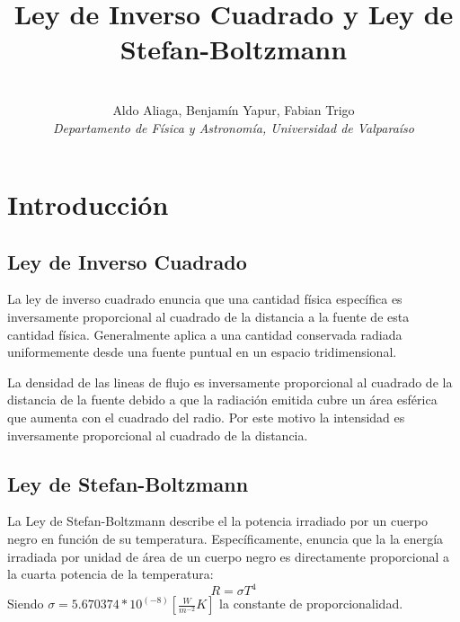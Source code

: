 \documentclass[a4paper,twocolumn,10pt]{article}
\begin{document}
\title{Ley de Inverso Cuadrado y Ley de Stefan-Boltzmann}
\author{ \\Aldo Aliaga, Benjamín Yapur, Fabian Trigo \\ \textit{Departamento de Física y Astronomía, Universidad de Valparaíso}}
\twocolumn[
  \begin{@twocolumnfalse}
    \maketitle
    \begin{abstract}
  
    \end{abstract}
  \end{@twocolumnfalse}\bigskip]

\vspace{2cm}

\section{Introducción}

\subsection{Ley de Inverso Cuadrado}
La ley de inverso cuadrado enuncia que una cantidad física específica es inversamente proporcional al cuadrado de la distancia a la fuente de esta cantidad física. Generalmente aplica a una cantidad conservada radiada uniformemente desde una fuente puntual en un espacio tridimensional. 

La densidad de las lineas de flujo es inversamente proporcional al cuadrado de la distancia de la fuente debido a que la radiación emitida cubre un área esférica que aumenta con el cuadrado del radio. Por este motivo la intensidad es inversamente proporcional al cuadrado de la distancia.

\subsection{Ley de Stefan-Boltzmann}
La Ley de Stefan-Boltzmann describe el la potencia irradiado por un cuerpo negro en función de su temperatura. Específicamente, enuncia que la la energía irradiada por unidad de área de un cuerpo negro es directamente proporcional a la cuarta potencia de la temperatura:
\begin{equation}
    R=\sigma T^4
\end{equation}
Siendo $\sigma= 5.670374*10^{(-8)} [\frac{W}{m^{-2}}K]$ la constante de proporcionalidad.
\end{document}
